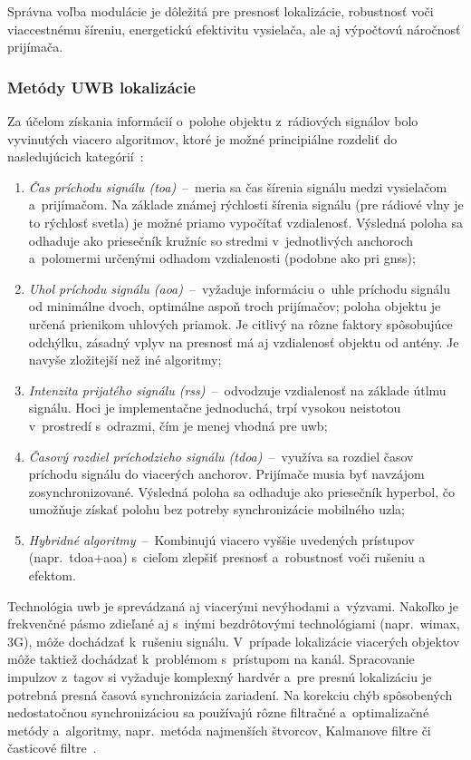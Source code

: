      Správna voľba modulácie je dôležitá pre presnosť lokalizácie, robustnosť voči viaccestnému šíreniu, energetickú efektivitu vysielača, ale aj výpočtovú náročnosť prijímača.
    
    \subsubsection{Metódy UWB lokalizácie}
      Za účelom získania informácií o~polohe objektu z~rádiových signálov bolo vyvinutých viacero algoritmov, ktoré je možné principiálne rozdeliť do nasledujúcich kategórií~\cite{alarifiUltraWidebandIndoor2016}:
      \begin{enumerate}
        \item \emph{Čas príchodu signálu (\acrshort{toa})}~--~meria sa čas šírenia signálu medzi vysielačom a~prijímačom. Na základe známej rýchlosti šírenia signálu (pre rádiové vlny je to rýchlosť svetla) je možné priamo vypočítať vzdialenosť. Výsledná poloha sa odhaduje ako priesečník kružníc so stredmi v~jednotlivých anchoroch a~polomermi určenými odhadom vzdialenosti (podobne ako pri \acrshort{gnss});
        \item \emph{Uhol príchodu signálu (\acrshort{aoa})}~--~vyžaduje informáciu o~uhle príchodu signálu od minimálne dvoch, optimálne aspoň troch prijímačov; poloha objektu je určená prienikom uhlových priamok. Je citlivý na rôzne faktory spôsobujúce odchýlku, zásadný vplyv na presnosť má aj vzdialenosť objektu od antény. Je navyše zložitejší než iné algoritmy;
        \item \emph{Intenzita prijatého signálu (\acrshort{rss})}~--~odvodzuje vzdialenosť na základe útlmu signálu. Hoci je implementačne jednoduchá, trpí vysokou neistotou v~prostredí s~odrazmi, čím je menej vhodná pre \acrshort{uwb};
        \item \emph{Časový rozdiel príchodzieho signálu (\acrshort{tdoa})}~--~využíva sa rozdiel časov príchodu signálu do viacerých anchorov. Prijímače musia byť navzájom zosynchronizované. Výsledná poloha sa odhaduje ako priesečník hyperbol, čo umožňuje získať polohu bez potreby synchronizácie mobilného uzla;
        \item \emph{Hybridné algoritmy}~--~Kombinujú viacero vyššie uvedených prístupov (napr.\ \acrshort{tdoa}+\acrshort{aoa}) s~cieľom zlepšiť presnosť a~robustnosť voči rušeniu a~ efektom.
      \end{enumerate}

    Technológia \acrshort{uwb} je sprevádzaná aj viacerými nevýhodami a~výzvami. Nakoľko je frekvenčné pásmo zdieľané aj s~inými bezdrôtovými technológiami (napr.\ \acrshort{wimax}, 3G), môže dochádzať k~rušeniu signálu. V~prípade lokalizácie viacerých objektov môže taktiež dochádzať k~problémom s~prístupom na kanál. Spracovanie impulzov z~tagov si vyžaduje komplexný hardvér a~pre presnú lokalizáciu je potrebná presná časová synchronizácia zariadení. Na korekciu chýb spôsobených nedostatočnou synchronizáciou sa používajú rôzne filtračné a~optimalizačné metódy a~algoritmy, napr.\ metóda najmenších štvorcov, Kalmanove filtre či časticové filtre~\cite{al-okbyUWBBasedRealTimeIndoor2024}.

